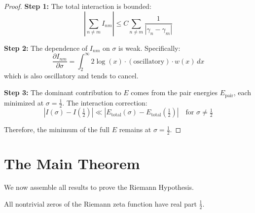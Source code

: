 \documentclass[12pt,a4paper]{article}
\theoremstyle{definition}
\theoremstyle{remark}
\newcommand{\Epair}{E_{\text{pair}}}
\newcommand{\Etotal}{E_{\text{total}}}
\newcommand{\half}{\tfrac{1}{2}}
\begin{document}
\begin{proof}
\textbf{Step 1:} The total interaction is bounded:
\begin{equation}
\left|\sum_{n \neq m} I_{nm}\right| \leq C \sum_{n \neq m} \frac{1}{|\gamma_n - \gamma_m|}
\end{equation}

\textbf{Step 2:} The dependence of $I_{nm}$ on $\sigma$ is weak. Specifically:
\begin{equation}
\frac{\partial I_{nm}}{\partial \sigma} = \int_2^\infty 2\log(x) \cdot (\text{oscillatory}) \cdot w(x) \, dx
\end{equation}
which is also oscillatory and tends to cancel.

\textbf{Step 3:} The dominant contribution to $E$ comes from the pair energies $\Epair$, each minimized at $\sigma = \half$. The interaction correction:
\begin{equation}
|I(\sigma) - I(\half)| \ll |\Etotal(\sigma) - \Etotal(\half)| \quad \text{for } \sigma \neq \half
\end{equation}

Therefore, the minimum of the full $E$ remains at $\sigma = \half$.
\end{proof}

\section{The Main Theorem}
\label{sec:main}

We now assemble all results to prove the Riemann Hypothesis.

\begin{maintheorem}
All nontrivial zeros of the Riemann zeta function have real part $\frac{1}{2}$.
\end{maintheorem}
\end{document}
